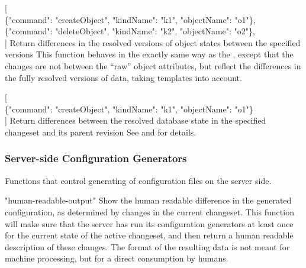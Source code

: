 \documentclass{article}
\begin{document}
    {[ \\
    \{"command": "createObject", "kindName": "k1", "objectName": "o1"\}, \\
    \{"command": "deleteObject", "kindName": "k2", "objectName": "o2"\}, \\
    ]}
    {Return differences in the resolved versions of object states between the specified versions}
    {This function behaves in the exactly same way as the , except that the changes are not
    between the ``raw'' object attributes, but reflect the differences in the fully resolved versions of data, taking
    templates  into account.}

    {[ \\
    \{"command": "createObject", "kindName": "k1", "objectName": "o1"\} \\
    ]}
    {Return differences between the resolved database state in the specified changeset and its parent revision}
    {See  and  for details.}

\subsubsection{Server-side Configuration Generators}
\label{sec:api-group-conf-generators}

Functions that control generating of configuration files on the server side.

    {"human-readable-output"}
    {Show the human readable difference in the generated configuration, as determined by changes in the current
    changeset.}
    {This function will make sure that the server has run its configuration generators at least once for the current
    state of the active changeset, and then return a human readable description of these changes.  The format of the
    resulting data is not meant for machine processing, but for a direct consumption by humans.}
\end{document}
